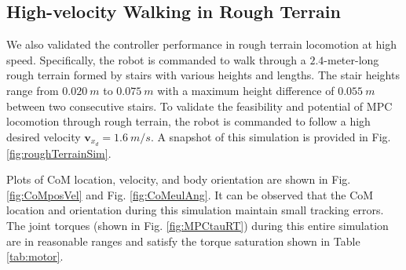 \subsection{High-velocity Walking in Rough Terrain}
We also validated the controller performance in rough terrain locomotion at high speed. Specifically, the robot is commanded to walk through a $2.4$-meter-long rough terrain formed by stairs with various heights and lengths. The stair heights range from $0.020\:\unit{m}$ to $0.075\:\unit{m}$ with a maximum height difference of $0.055\:\unit{m}$ between two consecutive stairs. To validate the feasibility and potential of MPC locomotion through rough terrain, the robot is commanded to follow a high desired velocity $\bm v_{x_d}=1.6 \:\unit{m/s}$. A snapshot of this simulation is provided in Fig. \ref{fig:roughTerrainSim}. 

Plots of CoM location, velocity, and body orientation are shown in Fig. \ref{fig:CoMposVel} and Fig. \ref{fig:CoMeulAng}. It can be observed that the CoM location and orientation during this simulation maintain small tracking errors. 
The joint torques (shown in Fig. \ref{fig:MPCtauRT}) during this entire simulation are in reasonable ranges and satisfy the torque saturation shown in Table \ref{tab:motor}. 


